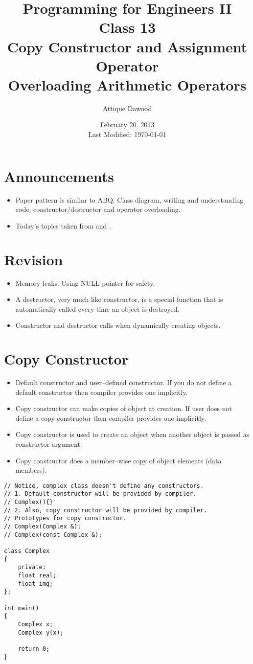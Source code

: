 \documentclass[12pt,a4paper]{article}
\title{\vspace{-2cm}Programming for Engineers II\\Class 13\\Copy Constructor and Assignment Operator\\Overloading Arithmetic Operators}
\author{Attique Dawood}
\date{February 20, 2013\\[0.2cm] Last Modified: \today}
\begin{document}
\maketitle
\section{Announcements}
\begin{itemize}
\item Paper pattern is similar to ABQ. Class diagram, writing and understanding code, constructor/destructor and operator overloading.
\item Today's topics taken from \cite{Ref:CPP-Copy-Constructor-and-Assignment-Operator} and \cite{Ref:CPP-Operator-Overloading}.
\end{itemize}
\section{Revision}
\begin{itemize}
\item Memory leaks. Using NULL pointer for safety.
\item A destructor, very much like constructor, is a special function that is automatically called every time an object is destroyed.
\item Constructor and destructor calls when dynamically creating objects.
\end{itemize}
\section{Copy Constructor}
\begin{itemize}
\item Default constructor and user--defined constructor. If you do not define a default constructor then compiler provides one implicitly.
\item Copy constructor can make copies of object at creation. If user does not define a copy constructor then compiler provides one implicitly.
\item Copy constructor is used to create an object when another object is passed as constructor argument.
\item Copy constructor does a member--wise copy of object elements (data members).
\end{itemize}
\begin{lstlisting}[caption={Copy Constructor}]
// Notice, complex class doesn't define any constructors.
// 1. Default constructor will be provided by compiler.
// Complex(){}
// 2. Also, copy constructor will be provided by compiler.
// Prototypes for copy constructor.
// Complex(Complex &);
// Complex(const Complex &);

class Complex
{
	private:
	float real;
	float img;
};

int main()
{
	Complex x;
	Complex y(x);
	
	return 0;
}
\end{lstlisting}
\end{document}
